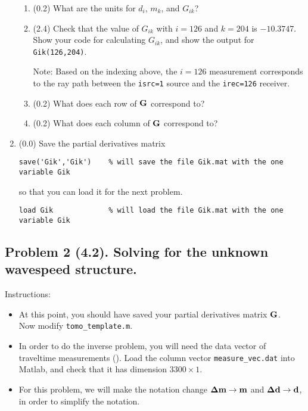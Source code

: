 \documentclass[11pt,titlepage,fleqn]{article}
\begin{document}
\begin{enumerate}
\begin{itemize}
\end{itemize}

\begin{enumerate}
\item (0.2) What are the units for $d_i$, $m_k$, and $G_{ik}$?

\item (2.4) Check that the value of $G_{ik}$ with $i=126$ and $k=204$ is $-10.3747$. \\ Show your code for calculating $G_{ik}$, and show the output for \verb+Gik(126,204)+.

Note: Based on the indexing above, the $i=126$ measurement corresponds to the ray path between the \verb+isrc=1+ source and the \verb+irec=126+ receiver.

\item (0.2) What does each row of $\mbox{${\bf G}$}$ correspond to?

\item (0.2) What does each column of $\mbox{${\bf G}$}$ correspond to?
\end{enumerate}


\item (0.0) Save the partial derivatives matrix
%
\begin{verbatim}
save('Gik','Gik')    % will save the file Gik.mat with the one variable Gik
\end{verbatim}
%
so that you can load it for the next problem.
%
\begin{verbatim}
load Gik             % will load the file Gik.mat with the one variable Gik
\end{verbatim}

\end{enumerate}


\subsection*{Problem 2 (4.2). Solving for the unknown wavespeed structure.}

Instructions:
%
\begin{itemize}
\item At this point, you should have saved your partial derivatives matrix $\mbox{${\bf G}$}$. \\ Now modify \verb+tomo_template.m+.

\item In order to do the inverse problem, you will need the data vector of traveltime measurements (). Load the column vector \verb+measure_vec.dat+ into Matlab, and check that it has dimension $3300 \times 1$.

\item For this problem, we will make the notation change $\mbox{\boldmath $\bf \Delta$}\mbox{${\bf m}$} \rightarrow \mbox{${\bf m}$}$ and $\mbox{\boldmath $\bf \Delta$}\mbox{${\bf d}$} \rightarrow \mbox{${\bf d}$}$, in order to simplify the notation.
\end{itemize}
\end{document}
